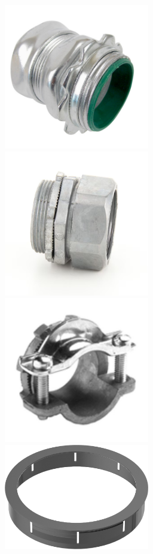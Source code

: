 \begin{figure}[p]
\includegraphics[width=2.5in]{../FIGURES/Compression_Fitting_3p5} \hfill
\includegraphics[width=2.5in]{../FIGURES/Zinc_Compression_Fitting} \\
\includegraphics[width=2.5in]{../FIGURES/Strap_Connector}  \hfill
\includegraphics[width=2.5in]{../FIGURES/Locking_Grommet} \\

\end{figure}
